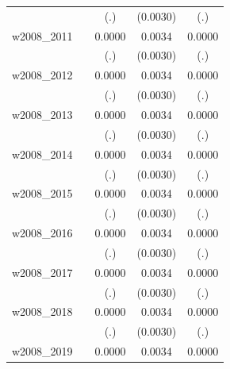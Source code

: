 \begin{table}[htbp]
\begin{tabular}{l*{4}{c}}
            &                     &         (.)         &    (0.0030)         &         (.)         \\
[1em]
w2008\_2011  &                     &      0.0000         &      0.0034         &      0.0000         \\
            &                     &         (.)         &    (0.0030)         &         (.)         \\
[1em]
w2008\_2012  &                     &      0.0000         &      0.0034         &      0.0000         \\
            &                     &         (.)         &    (0.0030)         &         (.)         \\
[1em]
w2008\_2013  &                     &      0.0000         &      0.0034         &      0.0000         \\
            &                     &         (.)         &    (0.0030)         &         (.)         \\
[1em]
w2008\_2014  &                     &      0.0000         &      0.0034         &      0.0000         \\
            &                     &         (.)         &    (0.0030)         &         (.)         \\
[1em]
w2008\_2015  &                     &      0.0000         &      0.0034         &      0.0000         \\
            &                     &         (.)         &    (0.0030)         &         (.)         \\
[1em]
w2008\_2016  &                     &      0.0000         &      0.0034         &      0.0000         \\
            &                     &         (.)         &    (0.0030)         &         (.)         \\
[1em]
w2008\_2017  &                     &      0.0000         &      0.0034         &      0.0000         \\
            &                     &         (.)         &    (0.0030)         &         (.)         \\
[1em]
w2008\_2018  &                     &      0.0000         &      0.0034         &      0.0000         \\
            &                     &         (.)         &    (0.0030)         &         (.)         \\
[1em]
w2008\_2019  &                     &      0.0000         &      0.0034         &      0.0000         \\

\end{tabular}
\end{table}
